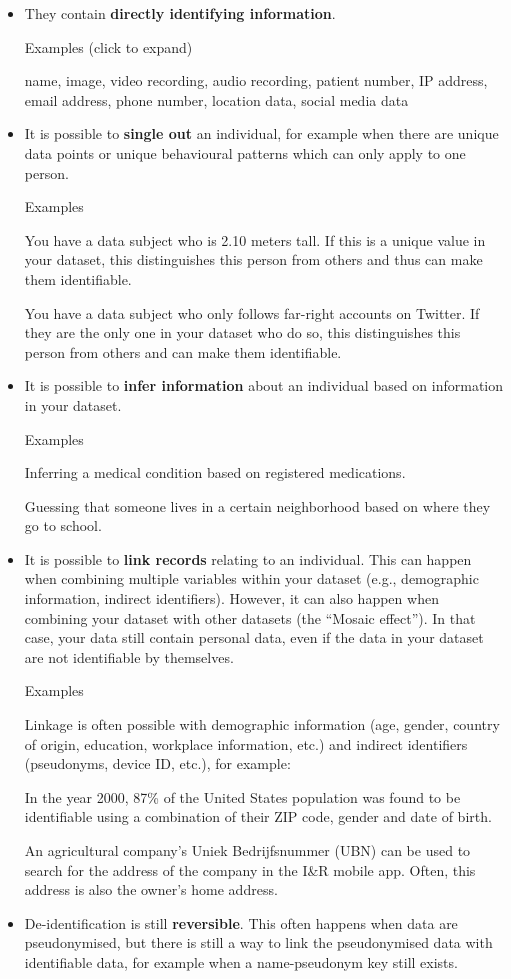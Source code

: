 \documentclass[
]{book}
\providecommand{\tightlist}{%
  \setlength{\itemsep}{0pt}\setlength{\parskip}{0pt}}
\begin{document}
\begin{itemize}
\tightlist
\item
  They contain \textbf{directly identifying information}.

  Examples (click to expand)

  name, image, video recording, audio recording, patient number, IP address,
  email address, phone number, location data, social media data
\item
  It is possible to \textbf{single out} an individual, for example when there are
  unique data points or unique behavioural patterns which can only apply to one
  person.

  Examples

  You have a data subject who is 2.10 meters tall. If this is a unique
  value in your dataset, this distinguishes this person from others and thus
  can make them identifiable.

  You have a data subject who only follows far-right accounts on Twitter.
  If they are the only one in your dataset who do so, this distinguishes this
  person from others and can make them identifiable.
\item
  It is possible to \textbf{infer information} about an individual based on information
  in your dataset.

  Examples

  Inferring a medical condition based on registered medications.

  Guessing that someone lives in a certain neighborhood based on where they go to school.
\item
  It is possible to \textbf{link records} relating to an individual. This can happen
  when combining multiple variables within your dataset (e.g., demographic
  information, indirect identifiers). However, it can also happen when combining
  your dataset with other datasets (the ``Mosaic effect''). In that case, your data
  still contain personal data, even if the data in your dataset are not
  identifiable by themselves.

  Examples

  Linkage is often possible with demographic information (age,
  gender, country of origin, education, workplace information, etc.) and
  indirect identifiers (pseudonyms, device ID, etc.), for example:

  In the year 2000, 87\% of the United States population
  was found to be identifiable using a combination of their ZIP code, gender
  and date of birth.

  An agricultural company's Uniek Bedrijfsnummer (UBN) can be used to
  search for the address of the company in the
  I\&R mobile app.
  Often, this address is also the owner's home address.
\item
  De-identification is still \textbf{reversible}. This often happens when data are
  pseudonymised, but there is still a way to link the pseudonymised data with
  identifiable data, for example when a name-pseudonym key still exists.
\end{itemize}
\end{document}
